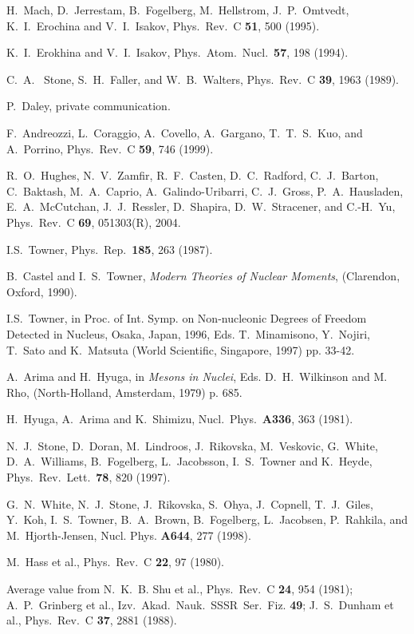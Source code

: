 \documentclass[aps,twocolumn,superscriptaddress,prc,showpacs]{revtex4}
\begin{document}
\begin{thebibliography}{9}
H.~Mach, D.~Jerrestam, B.~Fogelberg, M.~Hellstrom, J.~P.~Omtvedt,
K.~I.~Erochina and V.~I.~Isakov, Phys.~Rev.~C {\bf 51}, 500 (1995). 

K.~I.~Erokhina and V.~I.~Isakov, Phys.~Atom.~Nucl.~{\bf 57}, 198 (1994). 

C.~A.~ Stone, S.~H.~Faller, and W.~B.~Walters,
     Phys.~Rev.~C {\bf 39}, 1963 (1989).   

P.~Daley, private communication.

F.~Andreozzi, L.~Coraggio, A.~Covello, A.~Gargano,
     T.~T.~S.~Kuo, and A.~Porrino,  Phys.~Rev.~C {\bf 59}, 746 (1999).   

 R.~O.~Hughes, N.~V.~Zamfir, R.~F.~Casten, D.~C.~Radford, C.~J.~Barton,
C.~Baktash, M.~A.~Caprio, A.~Galindo-Uribarri, C.~J.~Gross, P.~A.~Hausladen, E.~A.~McCutchan,
J.~J.~Ressler, D.~Shapira, D.~W.~Stracener, and C.-H.~Yu,  Phys.~Rev.~C {\bf 69}, 051303(R), 2004.

I.S.~Towner, Phys.~Rep.~{\bf 185}, 263 (1987).  

     B.~Castel and I.~S.~Towner, {\em Modern Theories of Nuclear Moments},
     (Clarendon, Oxford, 1990).

     I.S.~Towner, in
     Proc. of Int. Symp. on Non-nucleonic Degrees of Freedom Detected
     in Nucleus, Osaka, Japan, 1996,
     Eds. T.~Minamisono, Y.~Nojiri, T.~Sato and K.~Matsuta (World
     Scientific, Singapore, 1997) pp. 33-42.

     A.~Arima and H.~Hyuga, in {\em Mesons in Nuclei},
Eds. D.~H.~Wilkinson and M.~ Rho, (North-Holland, Amsterdam, 1979) p. 685.

     H.~Hyuga, A.~Arima and K.~Shimizu, Nucl.~Phys.~{\bf A336}, 363 (1981).

     N.~J.~Stone, D.~Doran, M.~Lindroos, J.~Rikovska, M.~Veskovic,
     G.~White, D.~A.~Williams, B.~Fogelberg, L.~Jacobsson, I.~S.~Towner and
     K.~Heyde, Phys.~Rev.~Lett.~{\bf 78}, 820 (1997).    

 G.~N.~White, N.~J.~Stone, J.~Rikovska, S.~Ohya,
     J.~Copnell, T.~J.~Giles, Y.~Koh, I.~S.~Towner, B.~A.~Brown,
     B.~Fogelberg, L.~Jacobsen, P.~Rahkila, and M.~Hjorth-Jensen,
     Nucl. Phys. {\bf A644}, 277 (1998). 

 M.~Hass et al., Phys.~Rev.~C {\bf 22}, 97 (1980).

 Average value from
N.~K.~B. Shu et al., Phys.~Rev.~C {\bf 24}, 954 (1981);
A.~P.~Grinberg et al., Izv.~Akad.~Nauk.~SSSR~Ser.~Fiz. {\bf 49};
J.~S.~Dunham et al., Phys.~Rev.~C {\bf 37}, 2881 (1988). 


\end{thebibliography}
\end{document}
